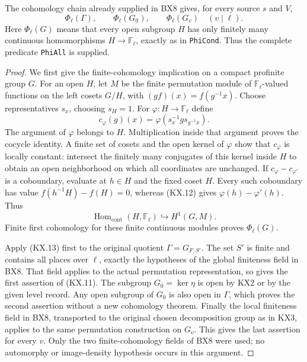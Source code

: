 \begin{theorem}
\label{claim:KX6}
The cohomology chain already supplied in BX8 gives, for every
source $s$ and $V$,
\[
 \Phi_\ell(\Gamma),\qquad\Phi_\ell(G_0),\qquad
                                \Phi_\ell(G_v)\quad(v\mid\ell).
                                                               \tag{KX.11}
\]
Here $\Phi_\ell(G)$ means that every open subgroup $H$ has only
finitely many continuous homomorphisms $H\to\mathbb F_\ell$,
exactly as in \texttt{PhiCond}.  Thus the complete predicate
\texttt{PhiAll} is supplied.
\end{theorem}
\begin{proof}
We first give the finite-cohomology implication on a compact
profinite group $G$.  For an open $H$, let $M$ be the finite
permutation module of $\mathbb F_\ell$-valued functions on the
left cosets $G/H$, with $(g f)(x)=f(g^{-1}x)$.
Choose representatives $s_x$, choosing $s_H=1$.
For $\varphi:H\to\mathbb F_\ell$ define
\[
       c_\varphi(g)(x)
             =\varphi(s_x^{-1}g s_{g^{-1}x}).
                                                               \tag{KX.12}
\]
The argument of $\varphi$ belongs to $H$.  Multiplication inside
that argument proves the cocycle identity.  A finite set of cosets
and the open kernel of $\varphi$ show that $c_\varphi$ is locally
constant: intersect the finitely many conjugates of this kernel
inside $H$ to obtain an open neighborhood on which all coordinates
are unchanged.  If $c_\varphi-c_{\varphi'}$ is a coboundary,
evaluate at $h\in H$ and the fixed coset $H$.  Every such
coboundary has value $f(h^{-1}H)-f(H)=0$, whereas (KX.12) gives
$\varphi(h)-\varphi'(h)$.  Thus
\[
           \operatorname{Hom}_{\mathrm{cont}}
                    (H,\mathbb F_\ell)\hookrightarrow H^1(G,M).
                                                               \tag{KX.13}
\]
Finite first cohomology for these finite continuous modules proves
$\Phi_\ell(G)$.

Apply (KX.13) first to the original quotient
$\Gamma=G_{F,S'}$.  The set $S'$ is finite and contains all places
over $\ell$, exactly the hypotheses of the global finiteness
field in BX8.  That field applies to the actual permutation
representation, so gives the first assertion of (KX.11).
The subgroup $G_0=\ker\eta$ is open by KX2 or by the given
level record.  Any open subgroup of $G_0$ is also open in
$\Gamma$, which proves the second assertion without a new
cohomology theorem.  Finally the local finiteness field in BX8,
transported to the original chosen decomposition group as in
KX3, applies to the same permutation construction on $G_v$.
This gives the last assertion for every $v$.
Only the two finite-cohomology fields of BX8 were used; no
automorphy or image-density hypothesis occurs in this argument.
\end{proof}

